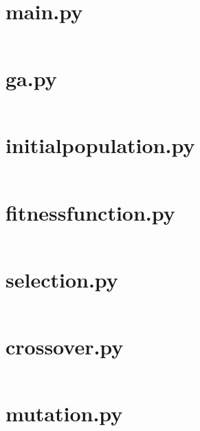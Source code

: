 \section{main.py}
\inputminted[linenos, fontsize=\footnotesize]{Python}{../main.py}

\newpage

\section{ga.py}
\inputminted[linenos, fontsize=\footnotesize]{Python}{../modules/ga.py}

\newpage

\section{initial{\textunderscore}population.py}
\inputminted[linenos, fontsize=\footnotesize]{Python}{
	../modules/initial_population.py}

\newpage

\section{fitness{\textunderscore}function.py}
\inputminted[linenos, fontsize=\footnotesize]{Python}{
	../modules/fitness_function.py}

\newpage

\section{selection.py}
\inputminted[linenos, fontsize=\footnotesize]{Python}{../modules/selection.py}

\newpage

\section{crossover.py}
\inputminted[linenos, fontsize=\footnotesize]{Python}{../modules/crossover.py}

\newpage

\section{mutation.py}
\inputminted[linenos, fontsize=\footnotesize]{Python}{../modules/mutation.py}